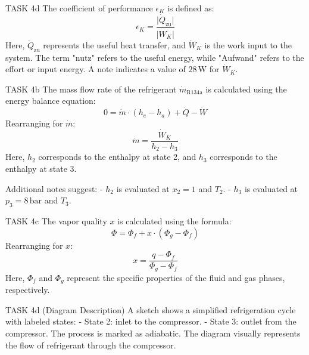 TASK 4d  
The coefficient of performance \( \epsilon_K \) is defined as:  
\[
\epsilon_K = \frac{\lvert \dot{Q}_{\text{zu}} \rvert}{\lvert \dot{W}_K \rvert}
\]  
Here, \( \dot{Q}_{\text{zu}} \) represents the useful heat transfer, and \( \dot{W}_K \) is the work input to the system. The term "nutz" refers to the useful energy, while "Aufwand" refers to the effort or input energy. A note indicates a value of \( 28 \, \text{W} \) for \( \dot{W}_K \).  

TASK 4b  
The mass flow rate of the refrigerant \( \dot{m}_{\text{R134a}} \) is calculated using the energy balance equation:  
\[
0 = \dot{m} \cdot (h_e - h_a) + \dot{Q} - \dot{W}
\]  
Rearranging for \( \dot{m} \):  
\[
\dot{m} = \frac{\dot{W}_K}{h_2 - h_3}
\]  
Here, \( h_2 \) corresponds to the enthalpy at state 2, and \( h_3 \) corresponds to the enthalpy at state 3.  

Additional notes suggest:  
- \( h_2 \) is evaluated at \( x_2 = 1 \) and \( T_2 \).  
- \( h_3 \) is evaluated at \( p_3 = 8 \, \text{bar} \) and \( T_3 \).  

TASK 4c  
The vapor quality \( x \) is calculated using the formula:  
\[
\Phi = \Phi_f + x \cdot (\Phi_g - \Phi_f)
\]  
Rearranging for \( x \):  
\[
x = \frac{q - \Phi_f}{\Phi_g - \Phi_f}
\]  
Here, \( \Phi_f \) and \( \Phi_g \) represent the specific properties of the fluid and gas phases, respectively.  

TASK 4d (Diagram Description)  
A sketch shows a simplified refrigeration cycle with labeled states:  
- State 2: inlet to the compressor.  
- State 3: outlet from the compressor.  
The process is marked as adiabatic. The diagram visually represents the flow of refrigerant through the compressor.  

